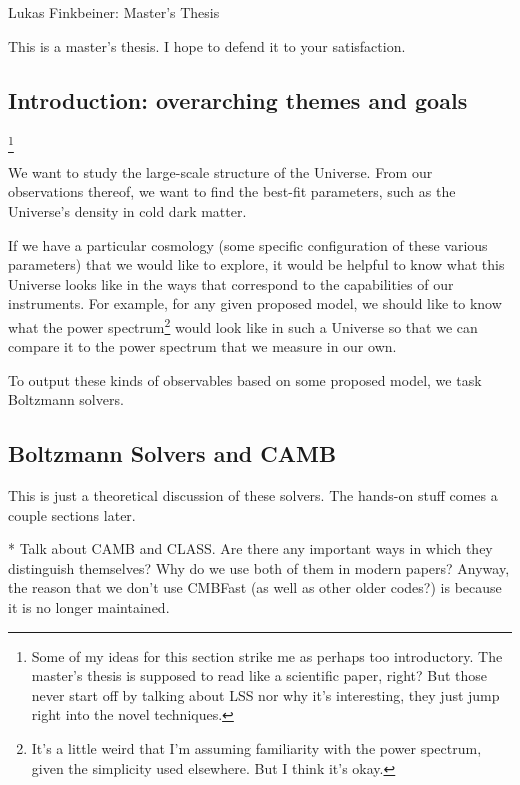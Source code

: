 \documentclass[11pt]{article}
\begin{document}
\fontsize{12}{15}

\begin{center}
Lukas Finkbeiner: Master's Thesis
\end{center}

This is a master's thesis. I hope to defend it to your satisfaction.

\begin{centering}
\section{Introduction: overarching themes and goals}
\end{centering}

\footnote{
    Some of my ideas for this section strike me as perhaps too introductory.
    The master's thesis is supposed to read like a scientific paper, right?
    But those never start off by talking about LSS nor why it's interesting,
    they just jump right into the novel techniques.
}

We want to study the large-scale structure of the Universe. From our
observations thereof, we want to find the best-fit parameters, such as
the Universe's density in cold dark matter.

If we have a particular cosmology (some specific configuration of these various
parameters) that we would like to explore, it would be helpful to know what
this Universe looks like in the ways that correspond to the capabilities of
our instruments. For example, for any given proposed model, we should like to
know what the power spectrum\footnote{It's a little weird that I'm assuming
familiarity with the power spectrum, given the simplicity used elsewhere.
But I think it's okay.} would look like
in such a Universe so that we
can compare it to the power spectrum that we measure in our own.

To output these kinds of observables based on some proposed model, we task
Boltzmann solvers.

\begin{centering}
\section{Boltzmann Solvers and CAMB}
\end{centering}

This is just a theoretical discussion of these solvers. The hands-on stuff
comes a couple sections later.

* Talk about CAMB and CLASS. Are there any important ways in which they
distinguish themselves? Why do we use both of them in modern papers? Anyway,
the reason that we don't use CMBFast (as well as other older codes?) is
because it is no longer maintained.
\end{document}
